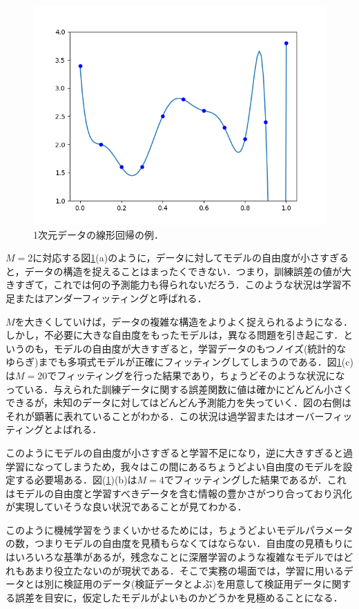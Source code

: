 \documentclass[a4paper,11pt]{jsreport}
\begin{document}
\begin{figure}[H]
\begin{minipage}[b]{0.3\linewidth}
    \includegraphics[keepaspectratio, scale=0.3]{image/多項式回帰(c).png}
  \end{minipage}
  \caption{1次元データの線形回帰の例．}
  \label{線形回帰}
\end{figure}

$M=2$に対応する図\ref{線形回帰}(a)のように，データに対してモデルの自由度が小さすぎると，データの構造を捉えることはまったくできない．つまり，訓練誤差の値が大きすぎて，これでは何の予測能力も得られないだろう．このような状況は学習不足またはアンダーフィッティングと呼ばれる．\par
$M$を大きくしていけば，データの複雑な構造をよりよく捉えられるようになる．しかし，不必要に大きな自由度をもったモデルは，異なる問題を引き起こす．というのも，モデルの自由度が大きすぎると，学習データのもつノイズ(統計的なゆらぎ)までも多項式モデルが正確にフィッティングしてしまうのである．図\ref{線形回帰}(c)は$M=20$でフィッティングを行った結果であり，ちょうどそのような状況になっている．与えられた訓練データに関する誤差関数に値は確かにどんどん小さくできるが，未知のデータに対してはどんどん予測能力を失っていく．図の右側はそれが顕著に表れていることがわかる．この状況は過学習またはオーバーフィッティングとよばれる．\par
このようにモデルの自由度が小さすぎると学習不足になり，逆に大きすぎると過学習になってしまうため，我々はこの間にあるちょうどよい自由度のモデルを設定する必要場ある．図(\ref{線形回帰})(b)は$M=4$でフィッティングした結果であるが．これはモデルの自由度と学習すべきデータを含む情報の豊かさがつり合っており汎化が実現していそうな良い状況であることが見てわかる．\par
このように機械学習をうまくいかせるためには，ちょうどよいモデルパラメータの数，つまりモデルの自由度を見積もらなくてはならない．自由度の見積もりにはいろいろな基準があるが，残念なことに深層学習のような複雑なモデルではどれもあまり役立たないのが現状である．そこで実務の場面では，学習に用いるデータとは別に検証用のデータ(検証データとよぶ)を用意して検証用データに関する誤差を目安に，仮定したモデルがよいものかどうかを見極めることになる．
\end{document}
